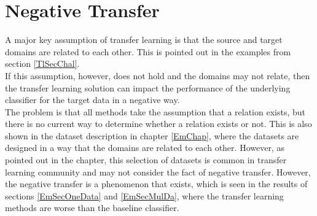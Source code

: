 \section{Negative Transfer}\label{TlSecNeg}
A major key assumption of transfer learning is that the source and target domains are related to each other.
This is pointed out in the examples from section \ref{TlSecChal}.\\
If this assumption, however, does not hold and the domains may not relate, then the transfer learning solution can impact the performance of the underlying classifier for the target data in a negative way.\cite[p. 29]{Weiss.2016}\\
The problem is that all methods take the assumption that a relation exists, but there is no current way to determine whether a relation exists or not.\cite[p. 1672]{Taylor.2009}
This is also shown in the dataset description in chapter \ref{EmChap}, where the datasets are designed in a way that the domains are related to each other.
However, as pointed out in the chapter, this selection of datasets is common in transfer learning community and may not consider the fact of negative transfer.
However, the negative transfer is a phenomenon that exists, which is seen in the results of sections \ref{EmSecOneData} and \ref{EmSecMulDa}, where the transfer learning methods are worse than the baseline classifier.

